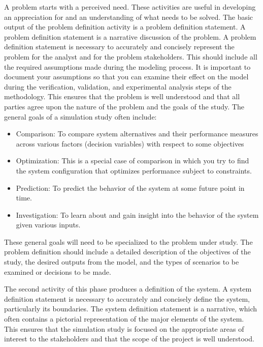 \documentclass[
]{book}
\theoremstyle{definition}
\theoremstyle{definition}
\theoremstyle{definition}
\theoremstyle{definition}
\theoremstyle{remark}
\begin{document}
A problem starts with a perceived need. These activities are useful in
developing an appreciation for and an understanding of what needs to be
solved. The basic output of the problem definition activity is a problem
definition statement. A problem definition statement is a narrative
discussion of the problem. A problem definition statement is necessary
to accurately and concisely represent the problem for the analyst and
for the problem stakeholders. This should include all the required
assumptions made during the modeling process. It is important to
document your assumptions so that you can examine their effect on the
model during the verification, validation, and experimental analysis
steps of the methodology. This ensures that the problem is well
understood and that all parties agree upon the nature of the problem and
the goals of the study. The general goals of a simulation study often
include:

\begin{itemize}
\item
  Comparison: To compare system alternatives and their performance
  measures across various factors (decision variables) with respect to
  some objectives
\item
  Optimization: This is a special case of comparison in which you try
  to find the system configuration that optimizes performance subject
  to constraints.
\item
  Prediction: To predict the behavior of the system at some future
  point in time.
\item
  Investigation: To learn about and gain insight into the behavior of
  the system given various inputs.
\end{itemize}

These general goals will need to be specialized to the problem under
study. The problem definition should include a detailed description of
the objectives of the study, the desired outputs from the model, and the
types of scenarios to be examined or decisions to be made.

The second activity of this phase produces a definition of the system. A
system definition statement is necessary to accurately and concisely
define the system, particularly its boundaries. The system definition
statement is a narrative, which often contains a pictorial
representation of the major elements of the system. This ensures that
the simulation study is focused on the appropriate areas of interest to
the stakeholders and that the scope of the project is well understood.
\end{document}
